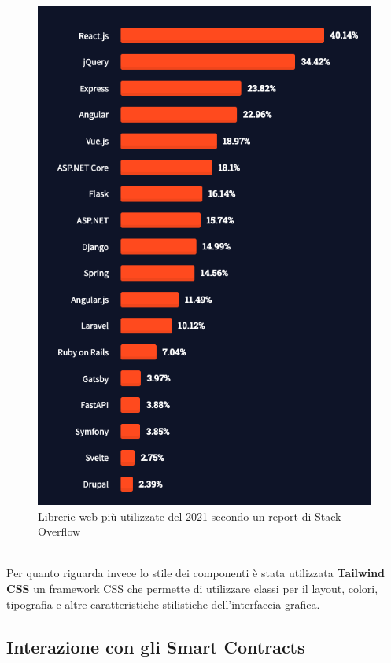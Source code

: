 \documentclass[12pt,a4paper]{report}
\begin{document}
\begin{figure}[H]
  \includegraphics[scale=0.45]{react.png}
  \centering
  \caption{Librerie web più utilizzate del 2021 secondo un report di Stack Overflow}
  \label{fig:react}
\end{figure}


\noindent\\Per quanto riguarda invece lo stile dei componenti è stata utilizzata \textbf{Tailwind CSS}\cite{tailwind} un framework CSS che permette di utilizzare classi per il layout, colori, tipografia e altre caratteristiche stilistiche dell'interfaccia grafica.

\subsection{Interazione con gli Smart Contracts}
\end{document}
